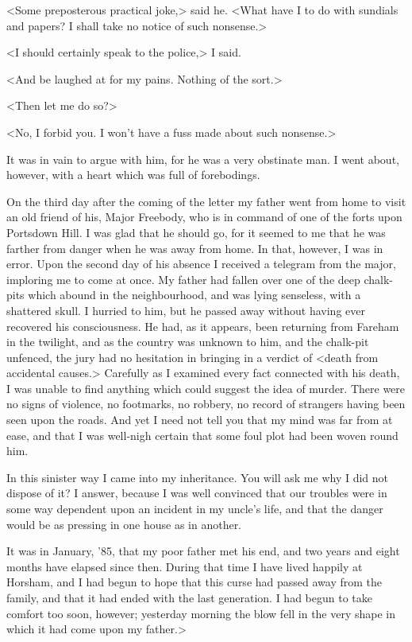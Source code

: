 <Some preposterous practical joke,> said he. <What have I to do with sundials and papers? I shall take no notice of such nonsense.>

<I should certainly speak to the police,> I said.

<And be laughed at for my pains. Nothing of the sort.>

<Then let me do so?>

<No, I forbid you. I won't have a fuss made about such nonsense.>

It was in vain to argue with him, for he was a very obstinate man. I went about, however, with a heart which was full of forebodings.

On the third day after the coming of the letter my father went from home to visit an old friend of his, Major Freebody, who is in command of one of the forts upon Portsdown Hill. I was glad that he should go, for it seemed to me that he was farther from danger when he was away from home. In that, however, I was in error. Upon the second day of his absence I received a telegram from the major, imploring me to come at once. My father had fallen over one of the deep chalk-pits which abound in the neighbourhood, and was lying senseless, with a shattered skull. I hurried to him, but he passed away without having ever recovered his consciousness. He had, as it appears, been returning from Fareham in the twilight, and as the country was unknown to him, and the chalk-pit unfenced, the jury had no hesitation in bringing in a verdict of <death from accidental causes.> Carefully as I examined every fact connected with his death, I was unable to find anything which could suggest the idea of murder. There were no signs of violence, no footmarks, no robbery, no record of strangers having been seen upon the roads. And yet I need not tell you that my mind was far from at ease, and that I was well-nigh certain that some foul plot had been woven round him.

In this sinister way I came into my inheritance. You will ask me why I did not dispose of it? I answer, because I was well convinced that our troubles were in some way dependent upon an incident in my uncle's life, and that the danger would be as pressing in one house as in another.

It was in January, '85, that my poor father met his end, and two years and eight months have elapsed since then. During that time I have lived happily at Horsham, and I had begun to hope that this curse had passed away from the family, and that it had ended with the last generation. I had begun to take comfort too soon, however; yesterday morning the blow fell in the very shape in which it had come upon my father.>

